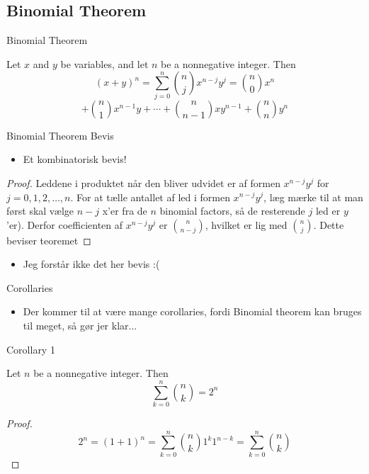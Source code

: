 \documentclass{beamer}
\begin{document}
\subsection{Binomial Theorem}

\begin{frame}{Binomial Theorem}
   \begin{theorem}
      Let $x$ and $y$ be variables, and let $n$ be a nonnegative integer. Then
      $$
      (x+y)^n= \sum^n_{j=0} \binom{n}{j} x^{n-j} y^j = \binom{n}{0} x^n $$
$$      + \binom{n}{1}x^{n-1}y + \cdots + \binom{n}{n-1}xy^{n-1} + \binom{n}{n}y^n   
      $$
   \end{theorem} 
\end{frame}

\begin{frame}{Binomial Theorem Bevis}
   \begin{itemize}
       \item Et kombinatorisk bevis!
   \end{itemize} 
   \begin{proof}
       Leddene i produktet når den bliver udvidet er af formen $x^{n-j}y^j$ for $j = 0,1,2, \ldots, n$. For at tælle antallet af led i formen $x^{n-j}y^j$, læg mærke til at man først skal vælge $n-j$ x'er fra de $n$ binomial factors, så de resterende $j$ led er $y$'er). Derfor coefficienten af $x^{n-j}y^j$ er $\binom{n}{n-j}$, hvilket er lig med $\binom{n}{j}$. Dette beviser teoremet
   \end{proof}
   \begin{itemize}
       \item Jeg forstår ikke det her bevis :(
   \end{itemize}
\end{frame}

\begin{frame}{Corollaries}
\begin{itemize}
    \item Der kommer til at være mange corollaries, fordi Binomial theorem kan bruges til meget, så gør jer klar...
\end{itemize}
\end{frame}

\begin{frame}{Corollary 1}
   \begin{corollary}
       Let $n$ be a nonnegative integer. Then 
       $$\sum^n_{k=0} \binom{n}{k} = 2^n$$
   \end{corollary} 
   \begin{proof}
       $$2^n = (1+1)^n = \sum^n_{k=0}\binom{n}{k}1^k1^{n-k} = \sum^n_{k=0} \binom{n}{k}$$
   \end{proof}
\end{frame}
\end{document}
